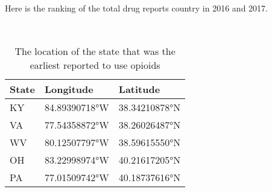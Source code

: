 \documentclass{mcmthesis}
\begin{document}
\newpage
 \noindent Here is the ranking of the total drug reports country in 2016 and 2017.\\
 \begin{figure}[h]
 	\centering
 \end{figure}\\   
\begin{table}[htbp]
	\centering
	\caption{The location of the state that was the earliest reported to use opioids}
	\begin{tabular}{p{5cm}p{5cm}p{3cm}} %
		\addlinespace
		\toprule
		State & Longitude   & Latitude \\
		\midrule
		KY    & \ang{84.89390718}W & \ang{38.34210878}N\\ 
		VA    & \ang{77.54358872}W & \ang{38.26026487}N\\
		WV    & \ang{80.12507797}W & \ang{38.59615550}N \\
		OH    & \ang{83.22998974}W & \ang{40.21617205}N\\
		PA    & \ang{77.01509742}W & \ang{40.18737616}N \\
		\bottomrule
	\end{tabular}%
	\label{tab:addlabel}%
\end{table}%
\end{document}
